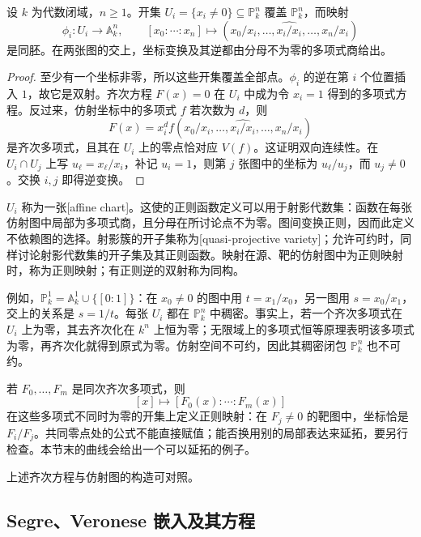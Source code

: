 \begin{proposition}
\label{g5:prop:projective-affine-charts}
	设 \(k\) 为代数闭域，\(n\geq1\)。开集 \(U_i=\{x_i\ne0\}\subseteq\mathbb P^n_k\) 覆盖 \(\mathbb P^n_k\)，而映射
	\[
		\phi_i:U_i\longrightarrow\mathbb A^n_k,\qquad
		[x_0:\cdots:x_n]\longmapsto(x_0/x_i,\ldots,\widehat{x_i/x_i},\ldots,x_n/x_i)
	\]
	是同胚。在两张图的交上，坐标变换及其逆都由分母不为零的多项式商给出。
\end{proposition}
\begin{proof}
	至少有一个坐标非零，所以这些开集覆盖全部点。\(\phi_i\) 的逆在第 \(i\) 个位置插入 \(1\)，故它是双射。齐次方程 \(F(x)=0\) 在 \(U_i\) 中成为令 \(x_i=1\) 得到的多项式方程。反过来，仿射坐标中的多项式 \(f\) 若次数为 \(d\)，则
	\[
		F(x)=x_i^d f(x_0/x_i,\ldots,\widehat{x_i/x_i},\ldots,x_n/x_i)
	\]
	是齐次多项式，且其在 \(U_i\) 上的零点恰对应 \(V(f)\)。这证明双向连续性。在 \(U_i\cap U_j\) 上写 \(u_\ell=x_\ell/x_i\)，补记 \(u_i=1\)，则第 \(j\) 张图中的坐标为 \(u_\ell/u_j\)，而 \(u_j\ne0\)。交换 \(i,j\) 即得逆变换。
\end{proof}

\(U_i\) 称为一张[affine chart]。这使的正则函数定义可以用于射影代数集：函数在每张仿射图中局部为多项式商，且分母在所讨论点不为零。图间变换正则，因而此定义不依赖图的选择。射影簇的开子集称为[quasi-projective variety]；允许可约时，同样讨论射影代数集的开子集及其正则函数。映射在源、靶的仿射图中为正则映射时，称为正则映射；有正则逆的双射称为同构。

例如，\(\mathbb P^1_k=\mathbb A^1_k\cup\{[0:1]\}\)：在 \(x_0\ne0\) 的图中用 \(t=x_1/x_0\)，另一图用 \(s=x_0/x_1\)，交上的关系是 \(s=1/t\)。每张 \(U_i\) 都在 \(\mathbb P^n_k\) 中稠密。事实上，若一个齐次多项式在 \(U_i\) 上为零，其去齐次化在 \(k^n\) 上恒为零；无限域上的多项式恒等原理表明该多项式为零，再齐次化就得到原式为零。仿射空间不可约，因此其稠密闭包 \(\mathbb P^n_k\) 也不可约。

若 \(F_0,\ldots,F_m\) 是同次齐次多项式，则
\[
	[x]\longmapsto[F_0(x):\cdots:F_m(x)]
\]
在这些多项式不同时为零的开集上定义正则映射：在 \(F_j\ne0\) 的靶图中，坐标恰是 \(F_i/F_j\)。共同零点处的公式不能直接赋值；能否换用别的局部表达来延拓，要另行检查。本节末的曲线会给出一个可以延拓的例子。

上述齐次方程与仿射图的构造可对照\cite[第I章，第2节，命题2.1--2.2]{Hartshorne1977}。

\subsection{Segre、Veronese 嵌入及其方程}
\label{g5:subsec:0103:02}

